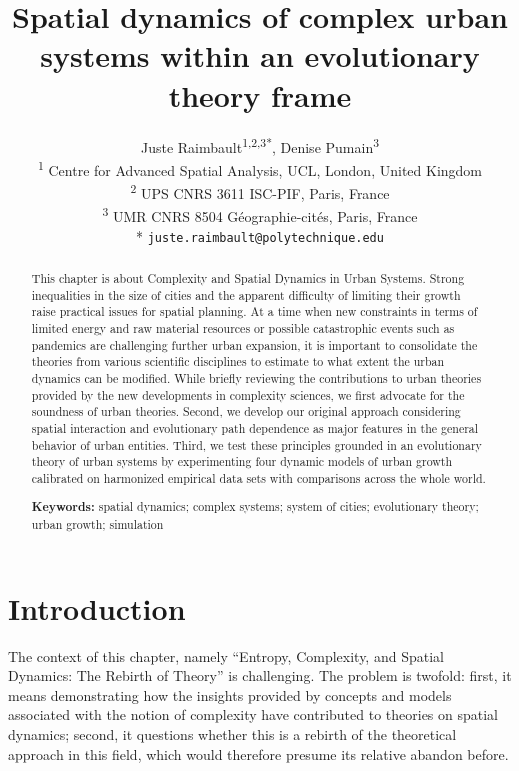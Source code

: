 \documentclass[10pt]{article}
\title{Spatial dynamics of complex urban systems within an evolutionary theory frame}
\date{}
\author{
Juste Raimbault\textsuperscript{1,2,3*},
Denise Pumain\textsuperscript{3}\bigskip\\
\textsuperscript{1} Centre for Advanced Spatial Analysis, UCL, London, United Kingdom
\\
\textsuperscript{2} UPS CNRS 3611 ISC-PIF, Paris, France
\\
\textsuperscript{3} UMR CNRS 8504 G{\'e}ographie-cit{\'e}s, Paris, France\bigskip\\
* \texttt{juste.raimbault@polytechnique.edu}
}
\begin{document}
\maketitle


\begin{abstract}
This chapter is about Complexity and Spatial Dynamics in Urban Systems. Strong inequalities in the size of cities and the apparent difficulty of limiting their growth raise practical issues for spatial planning. At a time when new constraints in terms of limited energy and raw material resources or possible catastrophic events such as pandemics are challenging further urban expansion, it is important to consolidate the theories from various scientific disciplines to estimate to what extent the urban dynamics can be modified. While briefly reviewing the contributions to urban theories provided by the new developments in complexity sciences, we first advocate for the soundness of urban theories. Second, we develop our original approach considering spatial interaction and evolutionary path dependence as major features in the general behavior of urban entities. Third, we test these principles grounded in an evolutionary theory of urban systems by experimenting four dynamic models of urban growth calibrated on harmonized empirical data sets with comparisons across the whole world.\medskip

	\textbf{Keywords:} spatial dynamics; complex systems; system of cities; evolutionary theory; urban growth; simulation
\end{abstract}


\justify



\section{Introduction}


The context of this chapter, namely ``Entropy, Complexity, and Spatial Dynamics: The Rebirth of Theory'' is challenging. The problem is twofold: first, it means demonstrating how the insights provided by concepts and models associated with the notion of complexity have contributed to theories on spatial dynamics; second, it questions whether this is a rebirth of the theoretical approach in this field, which would therefore presume its relative abandon before.
\end{document}
